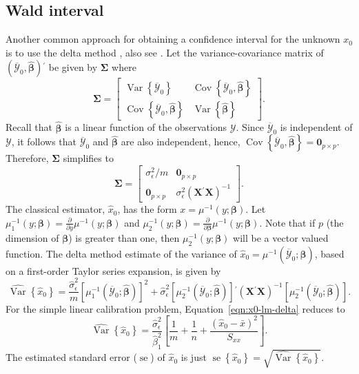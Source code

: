 \documentclass[cmfont,usenames,dvipsnames,leqno]{afit-etd}\usepackage[]{graphicx}\usepackage[]{color}
\newcommand{\trans}{\ensuremath{^\prime}}
\newcommand{\bc}[1]{\ensuremath{\bm{\mathcal{#1}}}}
\newcommand{\mc}[1]{\ensuremath{\mathcal{#1}}}
\newcommand{\wh}[1]{\ensuremath{\widehat{#1}}}
\newcommand{\wb}[1]{\ensuremath{\overline{#1}}}
\newcommand{\var}{\operatorname{Var}}
\newcommand{\cov}{\operatorname{Cov}}
\newcommand{\se}{\operatorname{se}}
\newcommand{\X}{\ensuremath{\bm{X}}}
\begin{document}
\subsection{Wald interval}
\label{sec:wald_int}
Another common approach for obtaining a confidence interval for the unknown $x_0$ is to use the delta method \citep{verhoef_who_2012, dorfman_note_1938}, also see \citet{casella_statistical_2002}. Let the variance-covariance matrix of $\left(\wb{\mc{Y}}_0, \wh{\bm{\beta}}\right)\trans$ be given by $\bm{\Sigma}$ where
\begin{equation*}
  \bm{\Sigma} = 
    \begin{bmatrix}
      \var\left\{\wb{\mc{Y}}_0\right\} & \cov\left\{\wb{\mc{Y}}_0, \wh{\bm{\beta}}\right\} \\
      \cov\left\{\wb{\mc{Y}}_0, \wh{\bm{\beta}}\right\} & \var\left\{\wh{\bm{\beta}}\right\}
    \end{bmatrix}.
\end{equation*}
Recall that $\wh{\bm{\beta}}$ is a linear function of the observations $\bc{Y}$. Since $\wb{\mc{Y}}_0$ is independent of $\bc{Y}$, it follows that $\wb{\mc{Y}}_0$ and $\wh{\bm{\beta}}$ are also independent, hence, $\cov\left\{\wb{\mc{Y}}_0, \wh{\bm{\beta}}\right\} = \bm{0}_{p \times p}$. Therefore, $\bm{\Sigma}$ simplifies to
\begin{equation*}
  \bm{\Sigma} = 
    \begin{bmatrix}
      \sigma_\epsilon^2/m & \bm{0}_{p \times p} \\
      \bm{0}_{p \times p} & \sigma_\epsilon^2\left(\X\trans\X\right)^{-1}
    \end{bmatrix}.
\end{equation*}
The classical estimator, $\wh{x}_0$, has the form $x = \mu^{-1}\left(y; \bm{\beta}\right)$. Let $\mu_1^{-1}\left(y; \bm{\beta}\right) = \frac{\partial}{\partial y}\mu^{-1}\left(y; \bm{\beta}\right)$ and $\mu_2^{-1}\left(y; \bm{\beta}\right) = \frac{\partial}{\partial \bm{\beta}}\mu^{-1}\left(y; \bm{\beta}\right)$. Note that if $p$ (the dimension of $\bm{\beta}$) is greater than one, then $\mu_2^{-1}\left(y; \bm{\beta}\right)$ will be a vector valued function. The delta method estimate of the variance of $\wh{x}_0 = \mu^{-1}\left(\wb{\mc{Y}}_0; \wh{\bm{\beta}}\right)$, based on a first-order Taylor series expansion, is given by
\begin{equation}
  \label{eqn:x0-lm-delta}
  \wh{\var}\left\{\wh{x}_0\right\} = \frac{\wh{\sigma}_\epsilon^2}{m}\left[\mu_1^{-1}\left(\wb{\mc{Y}}_0; \wh{\bm{\beta}}\right)\right]^2 + \wh{\sigma}_\epsilon^2\left[\mu_2^{-1}\left(\wb{\mc{Y}}_0; \wh{\bm{\beta}}\right)\right]\trans\left(\X\trans\X\right)^{-1}\left[\mu_2^{-1}\left(\wb{\mc{Y}}_0; \wh{\bm{\beta}}\right)\right].
\end{equation}
For the simple linear calibration problem, Equation~\eqref{eqn:x0-lm-delta} reduces to
\begin{equation*}
  \wh{\var}\left\{\wh{x}_0\right\} = \frac{\wh{\sigma}_\epsilon^2}{\wh{\beta}_1^2}\left[\frac{1}{m}+\frac{1}{n}+\frac{(\wh{x}_0-\bar{x})^2}{S_{xx}}\right]. 
\end{equation*}
The estimated standard error ($\se$) of $\wh{x}_0$ is just $\se\left\{\wh{x}_0\right\} = \sqrt{\wh{\var}\left\{\wh{x}_0\right\}}$.
\end{document}
